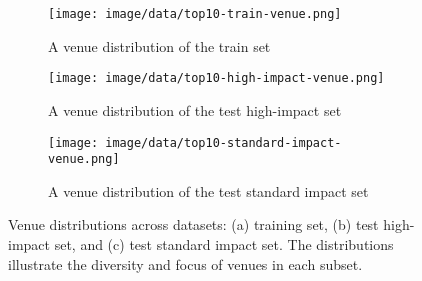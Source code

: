 \begin{figure}[ht!]
    \centering
    \begin{subfigure}{\linewidth}
        \centering
        \texttt{[image: image/data/top10-train-venue.png]}
        \caption{A venue distribution of the train set}
        \label{fig:train-venue-distribution}
    \end{subfigure}
    
    \begin{subfigure}{\linewidth}
        \centering
        \texttt{[image: image/data/top10-high-impact-venue.png]}
        \caption{A venue distribution of the test high-impact set}
        \label{fig:test-high-impact-venue-distribution}
    \end{subfigure}
    
    \begin{subfigure}{\linewidth}
        \centering
        \texttt{[image: image/data/top10-standard-impact-venue.png]}
        \caption{A venue distribution of the test standard impact set}
        \label{fig:test-standard-impact-venue-distribution}
    \end{subfigure}

    \caption{Venue distributions across datasets: (a) training set, (b) test high-impact set, and (c) test standard impact set. The distributions illustrate the diversity and focus of venues in each subset.}
    \label{fig:venue-distributions}
\end{figure}





